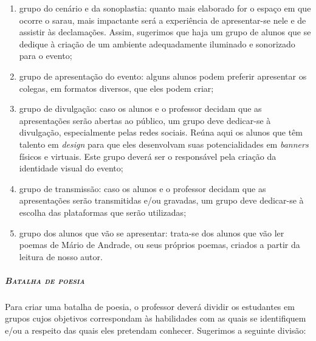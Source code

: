 \documentclass[11pt]{extarticle}
\begin{document}
\begin{enumerate}

\item grupo do cenário e da sonoplastia: quanto mais elaborado for o espaço
em que ocorre o sarau, mais impactante será a experiência de
apresentar-se nele e de assistir às declamações. Assim, sugerimos que
haja um grupo de alunos que se dedique à criação de um ambiente
adequadamente iluminado e sonorizado para o evento;

\item grupo de apresentação do evento: alguns alunos podem preferir
apresentar os colegas, em formatos diversos, que eles podem criar;

\item grupo de divulgação: caso os alunos e o professor decidam que as
apresentações serão abertas ao público, um grupo deve dedicar-se à
divulgação, especialmente pelas redes sociais. Reúna aqui os alunos que
têm talento em \emph{design} para que eles desenvolvam suas
potencialidades em \emph{banners} físicos e virtuais. Este grupo deverá
ser o responsável pela criação da identidade visual do evento;

\item grupo de transmissão: caso os alunos e o professor decidam que as
apresentações serão transmitidas e/ou gravadas, um grupo deve dedicar-se
à escolha das plataformas que serão utilizadas;

\item grupo dos alunos que vão se apresentar: trata-se dos alunos que vão
ler poemas de Mário de Andrade, ou seus próprios poemas, criados a
partir da leitura de nosso autor.

\end{enumerate}


\subparagraph{\textsc{Batalha de poesia}}

Para criar uma batalha de poesia, o professor deverá dividir os
estudantes em grupos cujos objetivos correspondam às habilidades com as
quais se identifiquem e/ou a respeito das quais eles pretendam conhecer.
Sugerimos a seguinte divisão:
\end{document}
